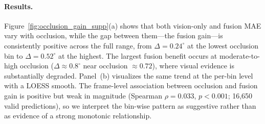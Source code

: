 \documentclass[letterpaper]{article} %
\newcommand{\degree}{^\circ}
\begin{document}
\paragraph{Results.}
Figure~\ref{fig:occlusion_gain_supp}(a) shows that both vision-only and fusion MAE
vary with occlusion, while the gap between them---the fusion gain---is consistently
positive across the full range, from $\Delta = 0.24\degree$ at the lowest occlusion
bin to $\Delta = 0.52\degree$ at the highest.
The largest fusion benefit occurs at moderate-to-high occlusion
($\Delta \approx 0.8\degree$ near occlusion $\approx 0.72$), where visual evidence
is substantially degraded.
Panel~(b) visualizes the same trend at the per-bin level with a LOESS smooth.
The frame-level association between occlusion and fusion gain is positive but
weak in magnitude (Spearman $\rho = 0.033$, $p < 0.001$; 16{,}650 valid
predictions), so we interpret the bin-wise pattern as suggestive rather than as
evidence of a strong monotonic relationship.



\FloatBarrier
\fi
\end{document}
